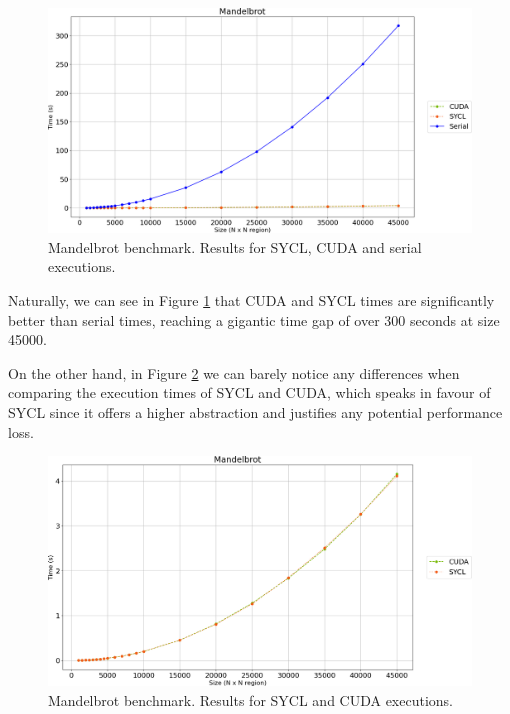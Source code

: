 \begin{figure}[H]
	\centering
	\includegraphics[width=\linewidth]{images/mandelbrot-sycl-cuda-serial.png}
	\caption{Mandelbrot benchmark. Results for SYCL, CUDA and serial executions.}
	\label{fig:mandelbrot-benchmark-all}
\end{figure}

Naturally, we can see in Figure \ref{fig:mandelbrot-benchmark-all} that CUDA and SYCL times are significantly better than serial times, reaching a gigantic time gap of over 300 seconds at size 45000.

On the other hand, in Figure \ref{fig:mandelbrot-benchmark-parallel} we can barely notice any differences when comparing the execution times of SYCL and CUDA, which speaks in favour of SYCL since it offers a higher abstraction and justifies any potential performance loss.

\begin{figure}[H]
	\centering
	\includegraphics[width=\linewidth]{images/mandelbrot-sycl-cuda.png}
	\caption{Mandelbrot benchmark. Results for SYCL and CUDA executions.}
	\label{fig:mandelbrot-benchmark-parallel}
\end{figure}

